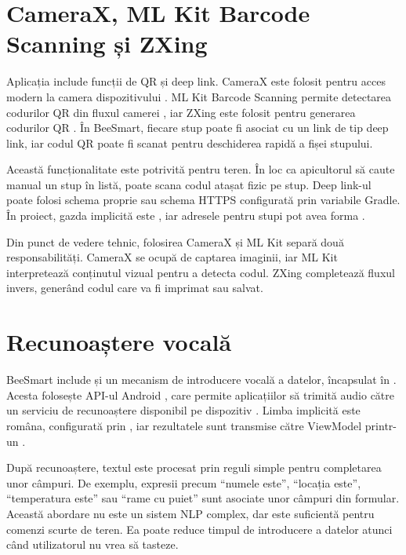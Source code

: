 \section{CameraX, ML Kit Barcode Scanning și ZXing}

Aplicația include funcții de QR și deep link. CameraX este folosit pentru acces modern la camera dispozitivului \cite{cameraXDocs}. ML Kit Barcode Scanning permite detectarea codurilor QR din fluxul camerei \cite{mlkitBarcodeDocs}, iar ZXing este folosit pentru generarea codurilor QR \cite{zxingProject}. În BeeSmart, fiecare stup poate fi asociat cu un link de tip deep link, iar codul QR poate fi scanat pentru deschiderea rapidă a fișei stupului.

Această funcționalitate este potrivită pentru teren. În loc ca apicultorul să caute manual un stup în listă, poate scana codul atașat fizic pe stup. Deep link-ul poate folosi schema proprie  sau schema HTTPS configurată prin variabile Gradle. În proiect, gazda implicită este , iar adresele pentru stupi pot avea forma .

Din punct de vedere tehnic, folosirea CameraX și ML Kit separă două responsabilități. CameraX se ocupă de captarea imaginii, iar ML Kit interpretează conținutul vizual pentru a detecta codul. ZXing completează fluxul invers, generând codul care va fi imprimat sau salvat.

\section{Recunoaștere vocală}

BeeSmart include și un mecanism de introducere vocală a datelor, încapsulat în . Acesta folosește API-ul Android , care permite aplicațiilor să trimită audio către un serviciu de recunoaștere disponibil pe dispozitiv \cite{androidSpeechRecognizerDocs}. Limba implicită este româna, configurată prin , iar rezultatele sunt transmise către ViewModel printr-un .

După recunoaștere, textul este procesat prin reguli simple pentru completarea unor câmpuri. De exemplu, expresii precum \enquote{numele este}, \enquote{locația este}, \enquote{temperatura este} sau \enquote{rame cu puiet} sunt asociate unor câmpuri din formular. Această abordare nu este un sistem NLP complex, dar este suficientă pentru comenzi scurte de teren. Ea poate reduce timpul de introducere a datelor atunci când utilizatorul nu vrea să tasteze.

